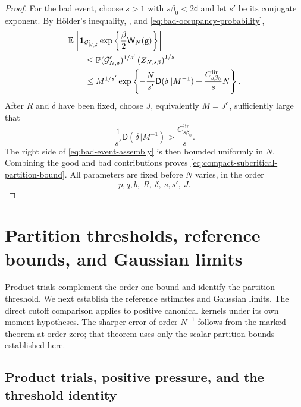 \documentclass[11pt,reqno]{amsart}
\numberwithin{equation}{section}
\theoremstyle{plain}
\theoremstyle{definition}
\renewcommand{\d}{\mathsf d}
\newcommand{\E}{\mathbb E}
\newcommand{\Pb}{\mathbb P}
\newcommand{\one}{\mathbf 1}
\newcommand{\be}{\beta}
\newcommand{\g}{\mathsf g}
\begin{document}
\begin{proof}
For the bad event, choose $s>1$ with $s\be_0<2\d$ and let $s'$ be its conjugate exponent.  By H\"older's inequality, , and \eqref{eq:bad-occupancy-probability},
\begin{align}
 &\E\left[\one_{\mathcal G_{N,\delta}^{\mathsf c}}
 \exp\left\{\frac\be2\mathsf W_N(\g)\right\}\right]
 \notag\\
 &\qquad\leq
 \Pb(\mathcal G_{N,\delta}^{\mathsf c})^{1/s'}
 \left(Z_{N,s\be}\right)^{1/s}
 \notag\\
 &\qquad\leq
 M^{1/s'}\exp\left\{-\frac{N}{s'}\mathsf D(\delta\Vert M^{-1})
 +\frac{C^{\mathrm{lin}}_{s\be_0}}{s}N\right\}.
 \label{eq:bad-event-assembly}
\end{align}
After $R$ and $\delta$ have been fixed, choose $J$, equivalently $M=J^{\d}$, sufficiently large that
\begin{equation}
 \frac1{s'}\mathsf D(\delta\Vert M^{-1})
 >\frac{C^{\mathrm{lin}}_{s\be_0}}s.
 \label{eq:grid-choice-bad-event}
\end{equation}
The right side of \eqref{eq:bad-event-assembly} is then bounded uniformly in $N$.  Combining the good and bad contributions proves \eqref{eq:compact-subcritical-partition-bound}.  All parameters are fixed before $N$ varies, in the order
\begin{equation}
 p,q,b,\ R,\ \delta,\ s,s',\ J.
 \label{eq:parameter-choice-order}
\end{equation}
\end{proof}

\section{Partition thresholds, reference bounds, and Gaussian limits}
\label{sec:thresholds-asymptotics}

Product trials complement the order-one bound and identify the partition threshold. We next establish the reference estimates and Gaussian limits. The direct cutoff comparison applies to positive canonical kernels under its own moment hypotheses. The sharper error of order $N^{-1}$ follows from the marked theorem at order zero; that theorem uses only the scalar partition bounds established here.

\subsection{Product trials, positive pressure, and the threshold identity}
\label{subsec:pressure-threshold-identity}
\end{document}
